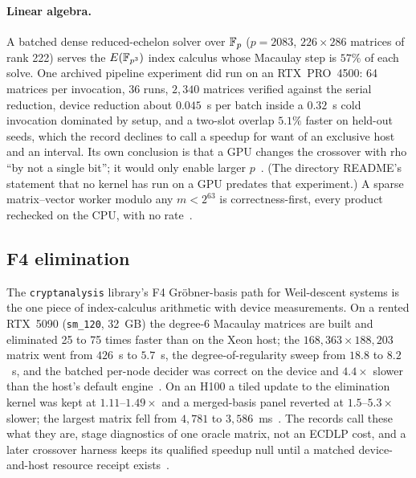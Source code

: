 \paragraph{Linear algebra.} A batched dense reduced-echelon solver
over $\mathbb{F}_p$ ($p=2083$, $226\times286$ matrices of rank 222) serves the
$E(\mathbb{F}_{p^3})$ index calculus whose Macaulay step is $57\%$ of each
solve. One archived pipeline experiment did run on an RTX~PRO~4500:
64 matrices per invocation, 36 runs, $2{,}340$ matrices verified
against the serial reduction, device reduction about $0.045$~s per
batch inside a $0.32$~s cold invocation dominated by setup, and a
two-slot overlap $5.1\%$ faster on held-out seeds, which the record
declines to call a speedup for want of an exclusive host and an
interval. Its own conclusion is that a GPU changes the crossover with
rho ``by not a single bit''; it would only enable larger
$p$~.
(The directory README's statement that no kernel has run on a GPU
predates that experiment.) A sparse matrix--vector worker modulo any
$m<2^{63}$ is correctness-first, every product rechecked on the CPU,
with no rate~.

\subsection{F4 elimination}
\label{sec:othergpu-f4}

The \texttt{cryptanalysis} library's F4 Gröbner-basis path for Weil-descent systems
is the one piece of index-calculus arithmetic with device
measurements. On a rented RTX~5090 (\texttt{sm\_120}, 32~GB) the
degree-6 Macaulay matrices are built and eliminated 25 to 75 times
faster than on the Xeon host; the $168{,}363\times188{,}203$ matrix
went from $426$~s to $5.7$~s, the degree-of-regularity sweep from
$18.8$ to $8.2$~s, and the batched per-node decider was correct on
the device and $4.4\times$ slower than the host's default
engine~.
On an H100 a tiled update to the elimination kernel was kept at
$1.11$--$1.49\times$ and a merged-basis panel reverted at
$1.5$--$5.3\times$ slower; the largest matrix fell from $4{,}781$ to
$3{,}586$~ms~.
The records call these what they are, stage diagnostics of one oracle
matrix, not an ECDLP cost, and a later crossover harness keeps its
qualified speedup null until a matched device-and-host resource
receipt exists~.

